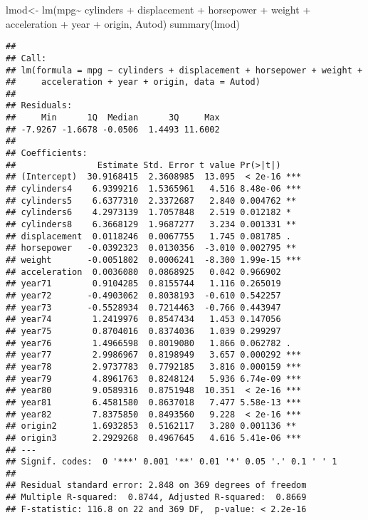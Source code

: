 \documentclass[
]{article}
\newenvironment{Shaded}{\begin{snugshade}}{\end{snugshade}}
\newcommand{\FunctionTok}[1]{\textcolor[rgb]{0.00,0.00,0.00}{#1}}
\newcommand{\NormalTok}[1]{#1}
\newcommand{\OtherTok}[1]{\textcolor[rgb]{0.56,0.35,0.01}{#1}}
\newcommand{\SpecialCharTok}[1]{\textcolor[rgb]{0.00,0.00,0.00}{#1}}
\begin{document}
\begin{Shaded}
\begin{Highlighting}[]
\NormalTok{lmod}\OtherTok{\textless{}{-}} \FunctionTok{lm}\NormalTok{(mpg}\SpecialCharTok{\textasciitilde{}}\NormalTok{ cylinders }\SpecialCharTok{+}\NormalTok{ displacement }\SpecialCharTok{+}\NormalTok{ horsepower }\SpecialCharTok{+}\NormalTok{ weight }\SpecialCharTok{+}\NormalTok{ acceleration }\SpecialCharTok{+}
\NormalTok{                       year }\SpecialCharTok{+}\NormalTok{ origin, Autod)}
\FunctionTok{summary}\NormalTok{(lmod)}
\end{Highlighting}
\end{Shaded}

\begin{verbatim}
## 
## Call:
## lm(formula = mpg ~ cylinders + displacement + horsepower + weight + 
##     acceleration + year + origin, data = Autod)
## 
## Residuals:
##     Min      1Q  Median      3Q     Max 
## -7.9267 -1.6678 -0.0506  1.4493 11.6002 
## 
## Coefficients:
##                Estimate Std. Error t value Pr(>|t|)    
## (Intercept)  30.9168415  2.3608985  13.095  < 2e-16 ***
## cylinders4    6.9399216  1.5365961   4.516 8.48e-06 ***
## cylinders5    6.6377310  2.3372687   2.840 0.004762 ** 
## cylinders6    4.2973139  1.7057848   2.519 0.012182 *  
## cylinders8    6.3668129  1.9687277   3.234 0.001331 ** 
## displacement  0.0118246  0.0067755   1.745 0.081785 .  
## horsepower   -0.0392323  0.0130356  -3.010 0.002795 ** 
## weight       -0.0051802  0.0006241  -8.300 1.99e-15 ***
## acceleration  0.0036080  0.0868925   0.042 0.966902    
## year71        0.9104285  0.8155744   1.116 0.265019    
## year72       -0.4903062  0.8038193  -0.610 0.542257    
## year73       -0.5528934  0.7214463  -0.766 0.443947    
## year74        1.2419976  0.8547434   1.453 0.147056    
## year75        0.8704016  0.8374036   1.039 0.299297    
## year76        1.4966598  0.8019080   1.866 0.062782 .  
## year77        2.9986967  0.8198949   3.657 0.000292 ***
## year78        2.9737783  0.7792185   3.816 0.000159 ***
## year79        4.8961763  0.8248124   5.936 6.74e-09 ***
## year80        9.0589316  0.8751948  10.351  < 2e-16 ***
## year81        6.4581580  0.8637018   7.477 5.58e-13 ***
## year82        7.8375850  0.8493560   9.228  < 2e-16 ***
## origin2       1.6932853  0.5162117   3.280 0.001136 ** 
## origin3       2.2929268  0.4967645   4.616 5.41e-06 ***
## ---
## Signif. codes:  0 '***' 0.001 '**' 0.01 '*' 0.05 '.' 0.1 ' ' 1
## 
## Residual standard error: 2.848 on 369 degrees of freedom
## Multiple R-squared:  0.8744, Adjusted R-squared:  0.8669 
## F-statistic: 116.8 on 22 and 369 DF,  p-value: < 2.2e-16
\end{verbatim}
\end{document}
